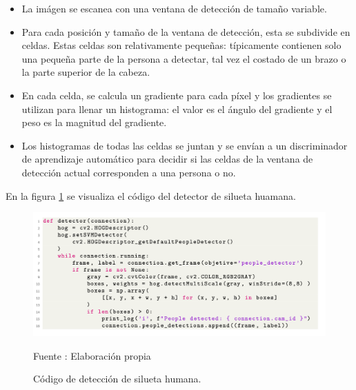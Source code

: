 \begin{itemize}
    \item La imágen se escanea con una ventana de detección de tamaño variable.
    \item Para cada posición y tamaño de la ventana de detección, esta se subdivide en celdas. Estas celdas son relativamente pequeñas: típicamente contienen solo una pequeña parte de la persona a detectar, tal vez el costado de un brazo o la parte superior de la cabeza.
    \item En cada celda, se calcula un gradiente para cada píxel y los gradientes se utilizan para llenar un histograma: el valor es el ángulo del gradiente y el peso es la magnitud del gradiente.
    \item Los histogramas de todas las celdas se juntan y se envían a un discriminador de aprendizaje automático para decidir si las celdas de la ventana de detección actual corresponden a una persona o no.
\end{itemize}

En la figura \ref{fig:human_detector} se visualiza el código del detector de silueta huamana.\\

\begin{figure}[H]
    \begin{center}
        \includegraphics[width=16cm]{img/capitulo_5/human_detector.png}
    \end{center}
    \begin{center}
        \caption{Código de detección de silueta humana.}
        Fuente : Elaboración propia
        \label{fig:human_detector}
    \end{center}
\end{figure}


